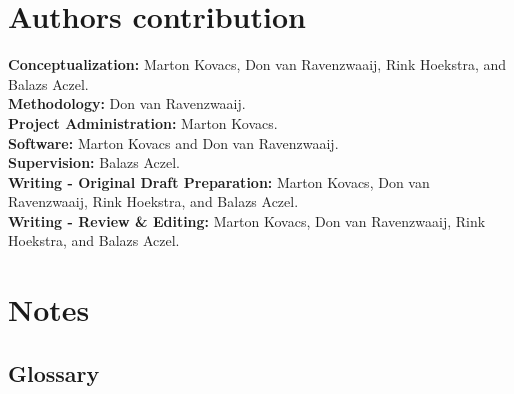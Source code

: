 \documentclass[
  english,
  man,floatsintext]{apa6}
\begin{document}
\hypertarget{authors-contribution}{%
\section{Authors contribution}\label{authors-contribution}}

\textbf{Conceptualization:} Marton Kovacs, Don van Ravenzwaaij, Rink Hoekstra, and Balazs Aczel.\\
\textbf{Methodology:} Don van Ravenzwaaij.\\
\textbf{Project Administration:} Marton Kovacs.\\
\textbf{Software:} Marton Kovacs and Don van Ravenzwaaij.\\
\textbf{Supervision:} Balazs Aczel.\\
\textbf{Writing - Original Draft Preparation:} Marton Kovacs, Don van Ravenzwaaij, Rink Hoekstra, and Balazs Aczel.\\
\textbf{Writing - Review \& Editing:} Marton Kovacs, Don van Ravenzwaaij, Rink Hoekstra, and Balazs Aczel.

\hypertarget{notes}{%
\section{Notes}\label{notes}}

\hypertarget{glossary}{%
\subsection{Glossary}\label{glossary}}
\end{document}
